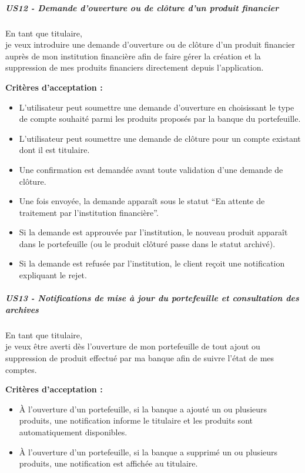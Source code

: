 \hypertarget{us12---demande-douverture-ou-de-cluxf4ture-dun-produit-financier}{%
\subparagraph{US12 - Demande d'ouverture ou de clôture d'un produit
financier}\label{us12---demande-douverture-ou-de-cluxf4ture-dun-produit-financier}}

En tant que titulaire,\\
je veux introduire une demande d'ouverture ou de clôture d'un produit
financier auprès de mon institution financière afin de faire gérer la
création et la suppression de mes produits financiers directement depuis
l'application.

\textbf{Critères d'acceptation :}

\begin{itemize}
\tightlist
\item
  L'utilisateur peut soumettre une demande d'ouverture en choisissant le
  type de compte souhaité parmi les produits proposés par la banque du
  portefeuille.
\item
  L'utilisateur peut soumettre une demande de clôture pour un compte
  existant dont il est titulaire.
\item
  Une confirmation est demandée avant toute validation d'une demande de
  clôture.
\item
  Une fois envoyée, la demande apparaît sous le statut ``En attente de
  traitement par l'institution financière''.
\item
  Si la demande est approuvée par l'institution, le nouveau produit
  apparaît dans le portefeuille (ou le produit clôturé passe dans le
  statut archivé).
\item
  Si la demande est refusée par l'institution, le client reçoit une
  notification expliquant le rejet.
\end{itemize}

\hypertarget{us13---notifications-de-mise-uxe0-jour-du-portefeuille-et-consultation-des-archives}{%
\subparagraph{US13 - Notifications de mise à jour du portefeuille et
consultation des
archives}\label{us13---notifications-de-mise-uxe0-jour-du-portefeuille-et-consultation-des-archives}}

En tant que titulaire,\\
je veux être averti dès l'ouverture de mon portefeuille de tout ajout ou
suppression de produit effectué par ma banque afin de suivre l'état de
mes comptes.

\textbf{Critères d'acceptation :}

\begin{itemize}
\tightlist
\item
  À l'ouverture d'un portefeuille, si la banque a ajouté un ou plusieurs
  produits, une notification informe le titulaire et les produits sont
  automatiquement disponibles.
\item
  À l'ouverture d'un portefeuille, si la banque a supprimé un ou
  plusieurs produits, une notification est affichée au titulaire.
\end{itemize}

